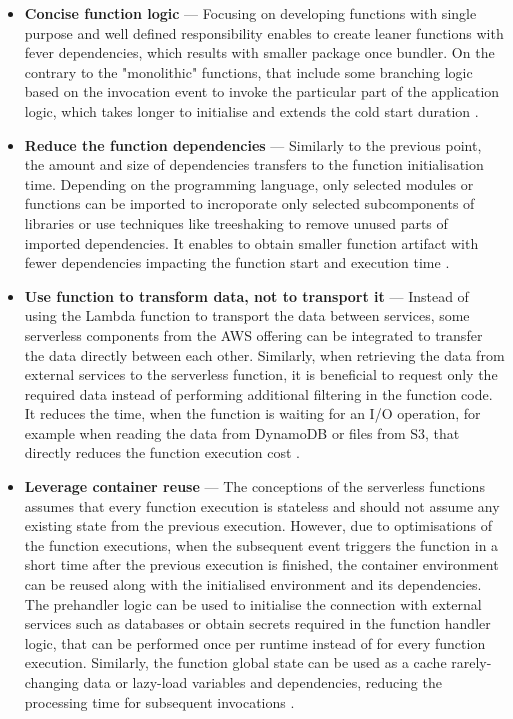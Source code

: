 \begin{itemize}
    \item \textbf{Concise function logic} --- Focusing on developing functions with single purpose and well defined responsibility enables to create leaner functions with fever dependencies, which results with smaller package once bundler. 
    On the contrary to the "monolithic" functions, that include some branching logic based on the invocation event to invoke the particular part of the application logic, which takes longer to initialise and extends the cold start duration \cite{BecomeAServerlessBlackBelt}.
    \item \textbf{Reduce the function dependencies} --- Similarly to the previous point, the amount and size of dependencies transfers to the function initialisation time. 
    Depending on the programming language, only selected modules or functions can be imported to incroporate only selected subcomponents of libraries or use techniques like treeshaking to remove unused parts of imported dependencies. 
    It enables to obtain smaller function artifact with fewer dependencies impacting the function start and execution time \cite{OptimiseYourServerlessApplications}.
    \item \textbf{Use function to transform data, not to transport it} --- Instead of using the Lambda function to transport the data between services, some serverless components from the AWS offering can be integrated to transfer the data directly between each other. 
    Similarly, when retrieving the data from external services to the serverless function, it is beneficial to request only the required data instead of performing additional filtering in the function code. It reduces the time, when the function is waiting for an I/O operation, for example when reading the data from DynamoDB or files from S3, that directly reduces the function execution cost \cite{BecomeAServerlessBlackBelt}.
    \item \textbf{Leverage container reuse} --- The conceptions of the serverless functions assumes that every function execution is stateless and should not assume any existing state from the previous execution. 
    However, due to optimisations of the function executions, when the subsequent event triggers the function in a short time after the previous execution is finished, the container environment can be reused along with the initialised environment and its dependencies.
    The prehandler logic can be used to initialise the connection with external services such as databases or obtain secrets required in the function handler logic, that can be performed once per runtime instead of for every function execution. 
    Similarly, the function global state can be used as a cache rarely-changing data or lazy-load variables and dependencies, reducing the processing time for subsequent invocations \cite{AWSLambdaPerformanceOptimization}.
\end{itemize}

